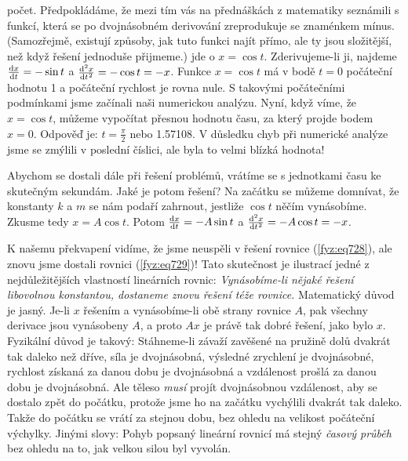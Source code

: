     počet. Předpokládáme, že mezi tím vás na přednáškách z matematiky seznámili s funkcí, která se
    po dvojnásobném derivování zreprodukuje se znaménkem mínus. (Samozřejmě, existují způsoby, jak
    tuto funkci najít přímo, ale ty jsou složitější, než když řešení jednoduše přijmeme.) jde o
    \(x=\cos t\). Zderivujeme-li ji, najdeme \(\diff{x}{t} = -\sin t\) a \(\diff[2]xt = -\cos t= -
    x\). Funkce \(x= \cos t\) má v bodě \(t= 0\) počáteční hodnotu \num{1} a počáteční rychlost je
    rovna nule. S takovými počátečními podmínkami jsme začínali naši numerickou analýzu. Nyní, když
    víme, že \(x= \cos t\), můžeme vypočítat přesnou hodnotu času, za který projde bodem \(x = 0\).
    Odpověď je: \(t= \frac{\pi}{2}\) nebo \num{1.57108}. V důsledku chyb při numerické analýze jsme
    se zmýlili v poslední číslici, ale byla to velmi blízká hodnota!

    Abychom se dostali dále při řešení problémů, vrátíme se s jednotkami času ke skutečným sekundám.
    Jaké je potom řešení? Na začátku se můžeme domnívat, že konstanty \(k\) a \(m\) se nám podaří
    zahrnout, jestliže \(\cos t\) něčím vynásobíme. Zkusme tedy \(x=A\cos t\). Potom \(\diff{x}{t}=
    -A\sin t\) a \(\diff[2]xt = -A\cos t= - x\).

    K našemu překvapení vidíme, že jsme neuspěli v řešení rovnice (\ref{fyz:eq728}), ale znovu jsme
    dostali rovnici (\ref{fyz:eq729})! Tato skutečnost je ilustrací jedné z nejdůležitějších
    vlastností lineárních rovnic: \emph{Vynásobíme-li nějaké řešení libovolnou konstantou, dostaneme
    znovu řešení téže rovnice.} Matematický důvod je jasný. Je-li \(x\) řešením a vynásobíme-li obě
    strany rovnice \(A\), pak všechny derivace jsou vynásobeny \(A\), a proto \(Ax\) je právě tak
    dobré řešení, jako bylo \(x\). Fyzikální důvod je takový: Stáhneme-li závaží zavěšené na pružině
    dolů dvakrát tak daleko než dříve, síla je dvojnásobná, výsledné zrychlení je dvojnásobné,
    rychlost získaná za danou dobu je dvojnásobná a vzdálenost prošlá za danou dobu je dvojnásobná.
    Ale těleso \emph{musí} projít dvojnásobnou vzdálenost, aby se dostalo zpět do počátku, protože
    jsme ho na začátku vychýlili dvakrát tak daleko. Takže do počátku se vrátí za stejnou dobu, bez
    ohledu na velikost počáteční výchylky. Jinými slovy: Pohyb popsaný lineární rovnicí má stejný
    \emph{časový průběh} bez ohledu na to, jak velkou silou byl vyvolán.

